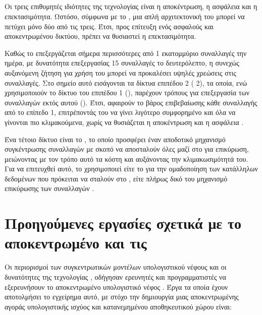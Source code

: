 \subsection{}
Οι τρεις επιθυμητές ιδιότητες της τεχνολογίας  είναι η αποκέντρωση, η ασφάλεια και η επεκτασιμότητα. Ωστόσο, σύμφωνα με το  \cite{ref23}, μια απλή αρχιτεκτονική του μπορεί να πετύχει μόνο δύο από τις τρεις. Έτσι, προς επίτευξη ενός ασφαλούς και αποκεντρωμένου δικτύου, πρέπει να θυσιαστεί η επεκτασιμότητα. 

Καθώς το  επεξεργάζεται σήμερα περισσότερες από 1 εκατομμύριο συναλλαγές την ημέρα, με δυνατότητα επεξεργασίας 15 συναλλαγές το δευτερόλεπτο, η συνεχώς αυξανόμενη ζήτηση για χρήση του μπορεί να προκαλέσει υψηλές χρεώσεις στις συναλλαγές.
Στο σημείο αυτό εισάγονται τα δίκτυα επιπέδου 2 ( 2), τα οποία, ενώ χρησιμοποιούν το δίκτυο του επιπέδου 1 (), παρέχουν τρόπους για επεξεργασία των συναλλαγών εκτός αυτού (). Έτσι, αφαιρούν το βάρος επιβεβαίωσης κάθε συναλλαγής από το επίπεδο 1, επιτρέποντάς του να γίνει λιγότερο συμφορημένο και όλα να γίνονται πιο κλιμακούμενα, χωρίς να θυσιάζεται η αποκέντρωση και η ασφάλεια \cite{ref24}. 

Ένα τέτοιο δίκτυο είναι το , το οποίο προσφέρει έναν αποδοτικό μηχανισμό συγκέντρωσης συναλλαγών με σκοπό να αποσταλούν όλες μαζί στο  για επικύρωση, μειώνοντας με τον τρόπο αυτό τα κόστη και αυξάνοντας την κλιμακωσιμότητά του. Για να επιτευχθεί αυτό, το  χρησιμοποιεί είτε το  για την ομαδοποίηση των κατάλληλων δεδομένων που πρόκειται να σταλούν στο , είτε πλήρως δικό του μηχανισμό επικύρωσης των συναλλαγών \cite{ref50,ref51}.



\section{Προηγούμενες εργασίες σχετικά με το αποκεντρωμένο  και τις }
Οι περιορισμοί των συγκεντρωτικών μοντέλων υπολογιστικού νέφους και οι 
δυνατότητες της τεχνολογίας , οδήγησαν ερευνητές και 
προγραμματιστές να εξερευνήσουν το αποκεντρωμένο υπολογιστικό νέφος \cite{ref25,ref26,ref27,ref28,ref29,ref30}. Έργα τα οποία έχουν αποτολμήσει το εγχείρημα αυτό, με στόχο την δημιουργία μιας 
αποκεντρωμένης αγοράς υπολογιστικής ισχύος και κατανεμημένου αποθηκευτικού 
χώρου είναι:

